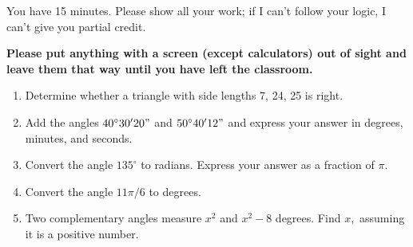 \documentclass{handout}
\begin{document}
\maketitle

You have 15 minutes. Please show all your work; if I can't follow your logic, I can't give you partial credit.

\textbf{Please put anything with a screen (except calculators) out of sight and leave them that way until you have left the classroom.}

\begin{enumerate}
  \item Determine whether a triangle with side lengths 7, 24, 25 is right.
  \item Add the angles \(40^\circ 30' 20"\) and \(50^\circ 40' 12"\) and express your answer in degrees, minutes, and seconds.
  \item Convert the angle \(135^\circ\) to radians. Express your answer as a fraction of \(\pi.\)
  \item Convert the angle \(11\pi/6\) to degrees.
  \item Two complementary angles measure \(x^2\) and \(x^2 - 8\) degrees. Find \(x,\) assuming it is a positive number.
\end{enumerate}
\end{document}
